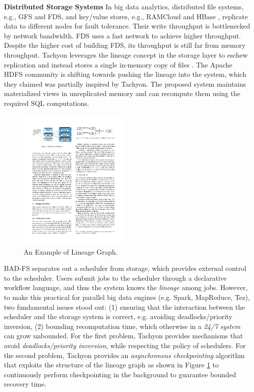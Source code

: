 \documentclass[twocolumn]{article}
\begin{document}
\noindent
\textbf{Distributed Storage Systems} In big data analytics, distributed file systems, e.g., GFS and FDS, and key/value stores, e.g., RAMCloud and HBase \cite{hbase:2015}, replicate data to different nodes for fault tolerance. Their write throughput is bottlenecked by network bandwidth. FDS uses a fast network to achieve higher throughput. Despite the higher cost of building FDS, its throughput is still far from memory throughput. Tachyon leverages the lineage concept in the storage layer to eschew replication and instead stores a single in-memory copy of files \cite{Li:2014}. The Apache HDFS community is shifting towards pushing the lineage into the system, which they claimed was partially inspired by Tachyon. The proposed system maintains materialized views in unreplicated memory and can recompute them using the required SQL computations.

\begin{figure}[htb]
        \centering
        \includegraphics[width=0.48\textwidth]{lineage_graph.pdf}
        \caption{An Example of Lineage Graph.}
        \label{fig:lineage_graph}
\end{figure} 

BAD-FS separates out a scheduler from storage, which provides external control to the scheduler. 
Users submit jobs to the scheduler through a declarative workflow language, 
and thus the system knows the \textit{lineage} among jobs. 
However, to make this practical for parallel big data engines (e.g. Spark, MapReduce, Tez), two fundamental issues stood out: (1) ensuring that the interaction between the scheduler and the storage system is correct, e.g. avoiding deadlocks/priority inversion, (2) bounding recomputation time, which otherwise in a \textit{24/7 system} can grow unbounded. 
For the first problem, Tachyon provides mechanisms that avoid \textit{deadlocks/priority inversion}, while respecting the policy of schedulers. For the second problem, Tachyon provides an \textit{asynchronous checkpointing} algorithm that exploits the structure of the lineage graph as shown in Figure \ref{fig:lineage_graph} to continuously perform checkpointing in the background to guarantee bounded recovery time.
\end{document}
